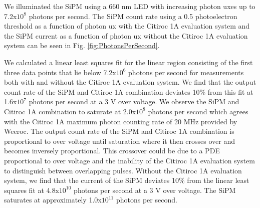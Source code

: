 \documentclass{article}
\begin{document}
We illuminated the SiPM using a 660 nm LED with increasing photon uxes up to 7.2x$10^8$ photons per second. The SiPM count rate using a 0.5 photoelectron threshold as a function of photon ux with the Citiroc 1A evaluation system and the SiPM current as a function of photon ux without the Citiroc 1A evaluation system can be seen in Fig. \ref{fig:PhotonsPerSecond}.

We calculated a linear least squares fit for the linear region consisting of the first three data points that lie
below 7.2x$10^6$ photons per second for measurements both with and without the Citiroc 1A evaluation system.
We find that the output count rate of the SiPM and Citiroc 1A combination deviates 10\% from this fit at 1.6x$10^7$
photons per second at a 3 V over voltage. We observe the SiPM and Citiroc 1A combination to saturate at 2.0x$10^8$ photons per second which agrees with the Citiroc 1A maximum photon counting rate of 20 MHz provided by Weeroc.\cite{Weeroc2019} The output count rate of the SiPM and Citiroc 1A combination is proportional to over voltage until saturation where it then crosses over and becomes inversely proportional. This crossover could be due to a PDE proportional to over voltage and the inability of the Citiroc 1A evaluation system to distinguish between overlapping pulses. Without the Citiroc 1A evaluation system, we find that the current of the SiPM deviates 10\% from the linear least squares fit at 4.8x$10^10$ photons per second at a 3 V over voltage. The SiPM saturates at approximately 1.0x$10^11$ photons per second.
\end{document}
